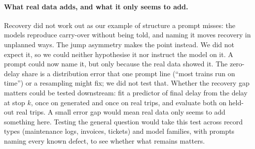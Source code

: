 \documentclass[11pt,a4paper]{article}
\begin{document}
\paragraph{What real data adds, and what it only seems to add.} Recovery did not work out as our example of structure a prompt misses: the models reproduce carry-over without being told, and naming it moves recovery in unplanned ways. The jump asymmetry makes the point instead. We did not expect it, so we could neither hypothesise it nor instruct the model on it. A prompt could now name it, but only because the real data showed it. The zero-delay share is a distribution error that one prompt line (``most trains run on time'') or a resampling might fix; we did not test that. Whether the recovery gap matters could be tested downstream: fit a predictor of final delay from the delay at stop $k$, once on generated and once on real trips, and evaluate both on held-out real trips. A small error gap would mean real data only seems to add something here. Testing the general question would take this test across record types (maintenance logs, invoices, tickets) and model families, with prompts naming every known defect, to see whether what remains matters.


\renewcommand{\bibfont}{\small}
\setlength{\bibsep}{2pt}


\end{document}
